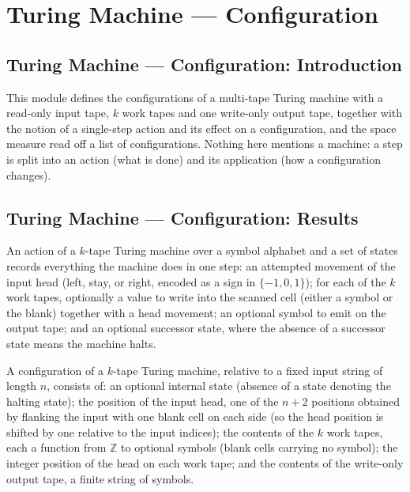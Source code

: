 \section{Turing Machine --- Configuration}
\subsection*{Turing Machine --- Configuration: Introduction}

This module defines the configurations of a multi-tape Turing machine with a read-only
input tape, $k$ work tapes and one write-only output tape, together with the notion of a
single-step action and its effect on a configuration, and the space measure read off a
list of configurations. Nothing here mentions a machine: a step is split into an action
(what is done) and its application (how a configuration changes).

\subsection*{Turing Machine --- Configuration: Results}

\begin{definition}
\label{Turing.Action}
\leanok
An action of a $k$-tape Turing machine over a symbol alphabet and a set of states records
everything the machine does in one step: an attempted movement of the input head (left,
stay, or right, encoded as a sign in $\{-1,0,1\}$); for each of the $k$ work tapes,
optionally a value to write into the scanned cell (either a symbol or the blank) together
with a head movement; an optional symbol to emit on the output tape; and an optional
successor state, where the absence of a successor state means the machine halts.
\end{definition}

\begin{definition}
\label{Turing.Cfg}
\leanok
A configuration of a $k$-tape Turing machine, relative to a fixed input string of length
$n$, consists of: an optional internal state (absence of a state denoting the halting
state); the position of the input head, one of the $n + 2$ positions obtained by flanking
the input with one blank cell on each side (so the head position is shifted by one
relative to the input indices); the contents of the $k$ work tapes, each a function from
$\mathbb{Z}$ to optional symbols (blank cells carrying no symbol); the integer position
of the head on each work tape; and the contents of the write-only output tape, a finite
string of symbols.
\end{definition}

